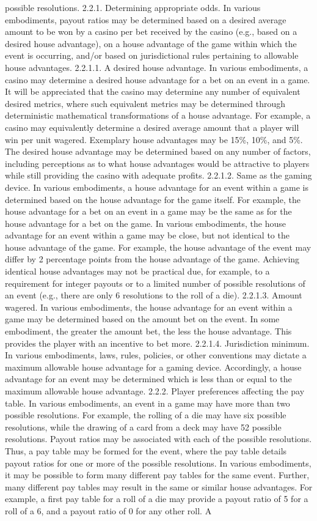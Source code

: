 \documentclass[11pt,a4paper]{article}
\begin{document}
possible resolutions. 2.2.1. Determining appropriate odds. In various embodiments, payout ratios may be determined based on a desired average amount to be won by a casino per bet received by the casino (e.g., based on a desired house advantage), on a house advantage of the game within which the event is occurring, and/or based on jurisdictional rules pertaining to allowable house advantages. 2.2.1.1. A desired house advantage. In various embodiments, a casino may determine a desired house advantage for a bet on an event in a game. It will be appreciated that the casino may determine any number of equivalent desired metrics, where such equivalent metrics may be determined through deterministic mathematical transformations of a house advantage. For example, a casino may equivalently determine a desired average amount that a player will win per unit wagered. Exemplary house advantages may be 15\%, 10\%, and 5\%. The desired house advantage may be determined based on any number of factors, including perceptions as to what house advantages would be attractive to players while still providing the casino with adequate profits. 2.2.1.2. Same as the gaming device. In various embodiments, a house advantage for an event within a game is determined based on the house advantage for the game itself. For example, the house advantage for a bet on an event in a game may be the same as for the house advantage for a bet on the game. In various embodiments, the house advantage for an event within a game may be close, but not identical to the house advantage of the game. For example, the house advantage of the event may differ by 2 percentage points from the house advantage of the game. Achieving identical house advantages may not be practical due, for example, to a requirement for integer payouts or to a limited number of possible resolutions of an event (e.g., there are only 6 resolutions to the roll of a die). 2.2.1.3. Amount wagered. In various embodiments, the house advantage for an event within a game may be determined based on the amount bet on the event. In some embodiment, the greater the amount bet, the less the house advantage. This provides the player with an incentive to bet more. 2.2.1.4. Jurisdiction minimum. In various embodiments, laws, rules, policies, or other conventions may dictate a maximum allowable house advantage for a gaming device. Accordingly, a house advantage for an event may be determined which is less than or equal to the maximum allowable house advantage. 2.2.2. Player preferences affecting the pay table. In various embodiments, an event in a game may have more than two possible resolutions. For example, the rolling of a die may have six possible resolutions, while the drawing of a card from a deck may have 52 possible resolutions. Payout ratios may be associated with each of the possible resolutions. Thus, a pay table may be formed for the event, where the pay table details payout ratios for one or more of the possible resolutions. In various embodiments, it may be possible to form many different pay tables for the same event. Further, many different pay tables may result in the same or similar house advantages. For example, a first pay table for a roll of a die may provide a payout ratio of 5 for a roll of a 6, and a payout ratio of 0 for any other roll. A 
\end{document}
